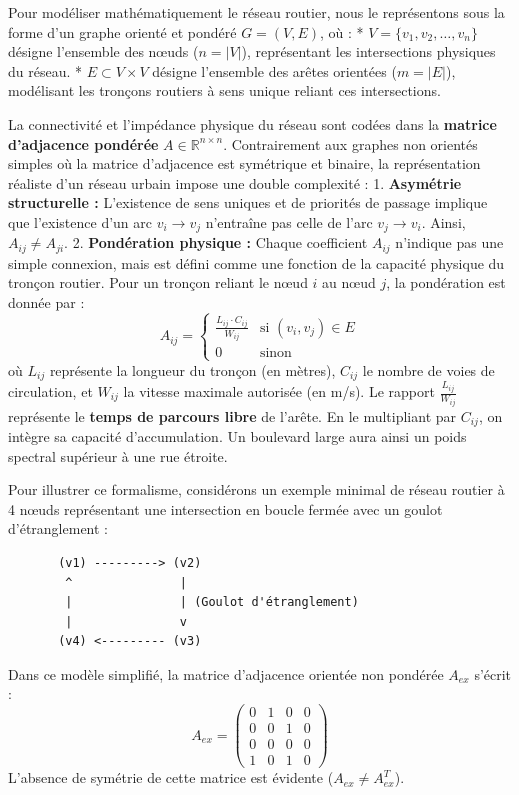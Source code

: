 \documentclass[11pt, a4paper]{article}
\begin{document}
Pour modéliser mathématiquement le réseau routier, nous le représentons
sous la forme d'un graphe orienté et pondéré \(G = (V, E)\), où : *
\(V = \{v_1, v_2, \dots, v_n\}\) désigne l'ensemble des nœuds
(\(n = |V|\)), représentant les intersections physiques du réseau. *
\(E \subset V \times V\) désigne l'ensemble des arêtes orientées
(\(m = |E|\)), modélisant les tronçons routiers à sens unique reliant
ces intersections.

La connectivité et l'impédance physique du réseau sont codées dans la
\textbf{matrice d'adjacence pondérée} \(A \in \mathbb{R}^{n \times n}\).
Contrairement aux graphes non orientés simples où la matrice d'adjacence
est symétrique et binaire, la représentation réaliste d'un réseau urbain
impose une double complexité : 1. \textbf{Asymétrie structurelle :}
L'existence de sens uniques et de priorités de passage implique que
l'existence d'un arc \(v_i \to v_j\) n'entraîne pas celle de l'arc
\(v_j \to v_i\). Ainsi, \(A_{ij} \neq A_{ji}\). 2. \textbf{Pondération
physique :} Chaque coefficient \(A_{ij}\) n'indique pas une simple
connexion, mais est défini comme une fonction de la capacité physique du
tronçon routier. Pour un tronçon reliant le nœud \(i\) au nœud \(j\), la
pondération est donnée par :
\[A_{ij} = \begin{cases} \frac{L_{ij} \cdot C_{ij}}{W_{ij}} & \text{si } (v_i, v_j) \in E \\ 0 & \text{sinon} \end{cases}\]
où \(L_{ij}\) représente la longueur du tronçon (en mètres), \(C_{ij}\)
le nombre de voies de circulation, et \(W_{ij}\) la vitesse maximale
autorisée (en m/s). Le rapport \(\frac{L_{ij}}{W_{ij}}\) représente le
\textbf{temps de parcours libre} de l'arête. En le multipliant par
\(C_{ij}\), on intègre sa capacité d'accumulation. Un boulevard large
aura ainsi un poids spectral supérieur à une rue étroite.

Pour illustrer ce formalisme, considérons un exemple minimal de réseau
routier à 4 nœuds représentant une intersection en boucle fermée avec un
goulot d'étranglement :

\begin{verbatim}
       (v1) ---------> (v2)
        ^               |
        |               | (Goulot d'étranglement)
        |               v
       (v4) <--------- (v3)
\end{verbatim}

Dans ce modèle simplifié, la matrice d'adjacence orientée non pondérée
\(A_{ex}\) s'écrit : \[A_{ex} = \begin{pmatrix}
0 & 1 & 0 & 0 \\
0 & 0 & 1 & 0 \\
0 & 0 & 0 & 0 \\
1 & 0 & 1 & 0
\end{pmatrix}\] L'absence de symétrie de cette matrice est évidente
(\(A_{ex} \neq A_{ex}^T\)).
\end{document}
